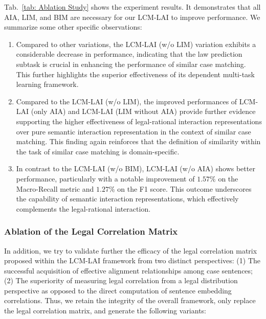 Tab.~\ref{tab: Ablation Study} shows the experiment results. It demonstrates that all AIA, LIM, and BIM are necessary for our LCM-LAI to improve performance.
We summarize some other specific observations:
\begin{enumerate}
    \item {
    Compared to other variations, the LCM-LAI (w/o LIM) variation exhibits a considerable decrease in performance, indicating that the law prediction subtask is crucial in enhancing the performance of similar case matching. 
    This further highlights the superior effectiveness of its dependent multi-task learning framework.
    }
    \item {
    Compared to the LCM-LAI (w/o LIM), the improved performances of LCM-LAI (only AIA) and LCM-LAI (LIM without AIA) provide further evidence supporting the higher effectiveness of legal-rational interaction representations over pure semantic interaction representation in the context of similar case matching. 
    This finding again reinforces that the definition of similarity within the task of similar case matching is domain-specific.
    }
    \item {
    In contrast to the LCM-LAI (w/o BIM), LCM-LAI (w/o AIA) shows better performance,  particularly with a notable improvement of $1.57\%$ on the Macro-Recall metric and $1.27\%$ on the F1 score.
    This outcome underscores the capability of semantic interaction representations, which effectively complements the legal-rational interaction.
    }
\end{enumerate}

\subsubsection{\textbf{Ablation of the Legal Correlation Matrix}}
In addition, we try to validate further the efficacy of the legal correlation matrix proposed within the LCM-LAI framework from two distinct perspectives: (1) The successful acquisition of effective alignment relationships among case sentences; (2) The superiority of measuring legal correlation from a legal distribution perspective as opposed to the direct computation of sentence embedding correlations. 
Thus, we retain the integrity of the overall framework, only replace the legal correlation matrix, and generate the following variants:

